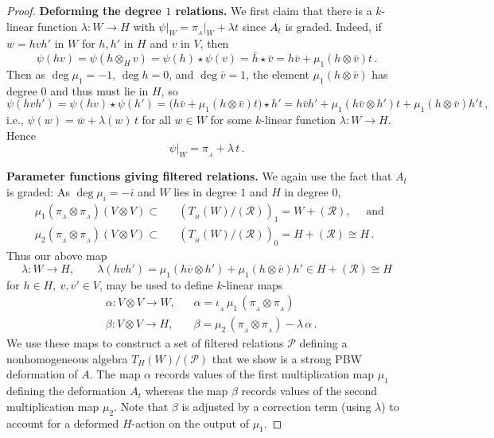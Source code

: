 \documentclass[11pt]{amsart}
\numberwithin{equation}{section}
\newcommand{\sA}{A }
\newcommand{\RR}{\mathscr{R} }
\newcommand{\PP}{\mathscr{P}}
\renewcommand{\_}[1]{\mbox{$_{\left( #1 \right)}$}}
\newcommand{\ot}{\otimes}
\newcommand{\Ho}{H}%
\begin{document}
{\begin{proof}
{\bf Deforming the degree $1$ relations.}
  We first claim that there is a $k$-linear
  function $\lambda: W\rightarrow \Ho$
  with $\psi\big|_{W}=\pi_{_\sA}\big|_{W}+\lambda t$ 
  since $\sA_t$ is graded.
  Indeed, if $w=hvh'$ in $W$ for $h,h'$ in $\Ho$ and $v$ in $V$, then
$$
\psi(hv)=\psi(h\ot_H v)=\psi(h)\star \psi(v) 
=\bar h\star \bar v  =  h \bar v + \mu_1(h\ot \bar v)t 
\, . 
$$
Then as $\deg\mu_1=-1$, $\deg h=0$, and $\deg \bar v=1$,
the element
$\mu_1(h\ot \bar v)$ has degree $0$ and thus must lie in $\Ho$,
so
$$
\psi(hvh')=\psi(hv)\star \psi(h') 
=\big(h\bar v + \mu_1(h\ot \bar v)t \big) \star h'
=h\bar vh' + \mu_1(h\bar v \ot h')t + \mu_1(h\ot \bar v) h' t\, ,
\, 
$$
i.e., $\psi(w)=\bar w+\lambda(w)\, t$ for all $w\in W$
for some $k$-linear function 
$\lambda: W \rightarrow H$.
Hence
\begin{equation}\label{psi}
  \psi\big|_{W}= \pi_{_\sA}+\lambda\, t
  \, .
  \end{equation}


{\bf Parameter functions giving filtered relations.}
We again use the fact that $\sA_t$ is graded:
As $\deg \mu_i=-i$ and $W$ lies in degree $1$
   and $\Ho$ in degree $0$,
   $$\begin{aligned}
     &\mu_1 (\pi_{_\sA}\ot \pi_{_\sA}) (V\ot V)\subset &&(T_{\! _H}(W)/(\RR))_1=W+(\RR),
   \quad\text{ and }\\
   &\mu_2 (\pi_{_\sA}\ot \pi_{_\sA}) (V\ot V)\subset &&(T_{\! _H}(W)/(\RR))_0=H+(\RR)\cong H
   \, .
   \end{aligned}
   $$
   Thus our above map
\begin{equation}\label{ConstructingLambda}
\lambda :W \longrightarrow H,
\qquad \lambda(hvh')=
\mu_1(h\bar v \ot h') + \mu_1(h\ot \bar v) h' \in H+(\RR)\cong H
\end{equation}
for $h\in H,\ v,v'\in V$,
may be used to 
define $k$-linear maps
\begin{equation}\label{ConstructingParameters}
\begin{aligned}
&\alpha:V\ot V\longrightarrow W,
&& \alpha= \iota_{_\sA}\, \mu_1 \, (\pi_{_\sA}\ot \pi_{_\sA})
\\
 &\beta:V\ot V\longrightarrow H,
 &&\beta= \mu_2\, (\pi_{_\sA}\ot \pi_{_\sA})
 -\lambda\, \alpha%
\, .
\end{aligned}
\end{equation}
We use these maps to construct a set of filtered relations $\PP$
defining a nonhomogeneous algebra $T_{H}(W)/(\PP)$ that we show
is a strong PBW deformation of $\sA$.  The map $\alpha$ records
values of the first multiplication map $\mu_1$ defining
the deformation $\sA_t$ whereas the map $\beta$
records values of the second multiplication map $\mu_2$.
Note that $\beta$ is adjusted by a correction term (using $\lambda$) to account for
a deformed $H$-action on the output of $\mu_1$.



\end{proof}}
\end{document}
